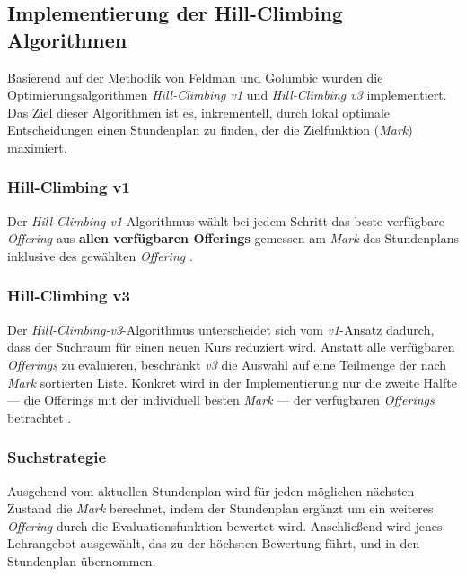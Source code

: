 \subsection{Implementierung der Hill-Climbing Algorithmen}

Basierend auf der Methodik von Feldman und Golumbic \cite{feldmangolumbic} wurden die Optimierungsalgorithmen \textit{Hill-Climbing v1} und \textit{Hill-Climbing v3} implementiert. Das Ziel dieser Algorithmen ist es, inkrementell, durch lokal optimale Entscheidungen einen Stundenplan zu finden, der die Zielfunktion (\textit{Mark}) maximiert.





\subsubsection{Hill-Climbing v1}

Der \textit{Hill-Climbing v1}-Algorithmus wählt bei jedem Schritt das beste verfügbare \textit{Offering} aus \textbf{allen verfügbaren Offerings} gemessen am \textit{Mark} des Stundenplans inklusive des gewählten \textit{Offering} \cite{gh-repo}.





\subsubsection{Hill-Climbing v3}

Der \textit{Hill-Climbing-v3}-Algorithmus unterscheidet sich vom \textit{v1}-Ansatz dadurch, dass der Suchraum für einen neuen Kurs reduziert wird. Anstatt alle verfügbaren \textit{Offerings} zu evaluieren, beschränkt \textit{v3} die Auswahl auf eine Teilmenge der nach \textit{Mark} sortierten Liste.
Konkret wird in der Implementierung nur die zweite Hälfte --- die Offerings mit der individuell besten \textit{Mark} --- der verfügbaren \textit{Offerings} betrachtet \cite{gh-repo}.





\subsubsection{Suchstrategie}

Ausgehend vom aktuellen Stundenplan wird für jeden möglichen nächsten Zustand die \textit{Mark} berechnet, indem der Stundenplan ergänzt um ein weiteres \textit{Offering} durch die Evaluationsfunktion bewertet wird. Anschließend wird jenes Lehrangebot ausgewählt, das zu der höchsten Bewertung führt, und in den Stundenplan übernommen.

